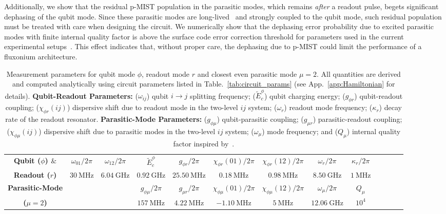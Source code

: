 \documentclass[%
reprint,
superscriptaddress,
 amsmath,amssymb,
 aps,
 prx,
longbibliography,
floatfix,
]{revtex4-2}
\begin{document}
Additionally, we show that the residual p-MIST population in the parasitic modes, which remains \textit{after} a readout pulse, begets significant dephasing of the qubit mode. Since these parasitic modes are long-lived~\cite{masluk_microwave_2012} and strongly coupled to the qubit mode, such residual population must be treated with care when designing the circuit. We numerically show that the dephasing error probability due to excited parasitic modes with finite internal quality factor is above the surface code error correction threshold for parameters used in the current experimental setups~\cite{masluk_microwave_2012,zhang_universal_2021,manucharyan2009fluxonium}. This effect indicates that, without proper care, the dephasing due to p-MIST could limit the performance of a fluxonium architecture.

\renewcommand{\arraystretch}{1.5} %


\begin{table}[tb]
    \centering
\begin{tabular}{|c|c|c|c|c|c|c|c|c|c|c|c|c|}
    \hline
    \textbf{Qubit ($\phi$) $\&$}&$\omega_{01}/2\pi$&$\omega_{12}/2\pi$ &$\tilde{E}^\phi_c$ &$g_{\phi r}/2\pi$&$\chi_{\phi r}(01)/2\pi$&$\chi_{\phi r}(12)/2\pi$&$\omega_r/2\pi$&$\kappa_r/2\pi$\\
    \cline{2-9}
\textbf{Readout ($r$)}&$30 \ \mathrm{MHz}$& $6.04 \ \mathrm{GHz}$ & $0.92 \ \mathrm{GHz}$& $25.50 \ \mathrm{MHz}$& $0.18 \ \mathrm{MHz}$&$0.98 \ \mathrm{MHz}$&$8.50 \ \mathrm{GHz}$&$1 \ \mathrm{MHz}$\\    
\hline\textbf{Parasitic-Mode} & \multicolumn{2}{c|}{} & $g_{\phi\mu}/2\pi$&$g_{\mu r}/2\pi$&$\chi_{\phi\mu}(01)/2\pi$&$\chi_{\phi\mu}(12)/2\pi$&$\omega_\mu/2\pi$&$Q_\mu$\\
    \cline{4-9}
\textbf{($\mu=2$)}&\multicolumn{2}{c|}{} &$157 \ \mathrm{MHz}$& $4.22 \ \mathrm{MHz}$& $-1.10 \ \mathrm{MHz}$& $5 \ \mathrm{MHz}$& $12.06 \ \mathrm{GHz}$&$10^{4}$\\    
\hline
\end{tabular}
\caption{Measurement parameters for qubit mode $\phi$, readout mode $r$ and closest even parasitic mode $\mu=2$.  All quantities are derived and computed analytically using circuit parameters listed in Table.~\ref{tab:circuit_params} (see App.~\ref{app:Hamiltonian} for details). \textbf{Qubit-Readout Parameters:} ($\omega_{ij}$) qubit $i\rightarrow j$ splitting frequency; ($\tilde{E}^\phi_c$) qubit charging energy; ($g_{\phi r}$) qubit-readout coupling; ($\chi_{\phi r}(ij)$) dispersive shift due to readout mode in the two-level $ij$ system; ($\omega_r$) readout mode frequency; ($\kappa_r$) decay rate of the readout resonator. \textbf{Parasitic-Mode Parameters:} ($g_{\phi \mu}$) qubit-parasitic coupling; ($g_{\mu r}$) parasitic-readout coupling; ($\chi_{\phi \mu}(ij)$) dispersive shift due to parasitic modes in the two-level $ij$ system; ($\omega_\mu$) mode frequency; and ($Q_\mu$) internal quality factor inspired by~\cite{masluk_microwave_2012}.}   \label{tab:readout_params}
\end{table}
\end{document}
